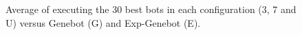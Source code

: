 {\begin{figure}
 \newline
{}
\caption{Average of executing the 30 best bots in each configuration (3, 7 and U) versus Genebot (G) and Exp-Genebot (E).}


\end{figure}}
